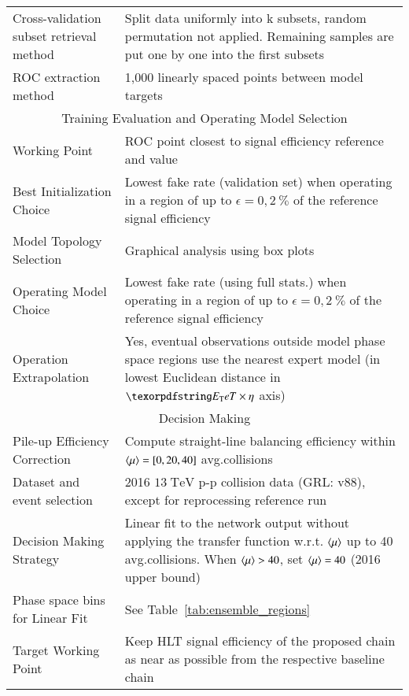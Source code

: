 \begin{table}[ht!]
{\begin{tabular}{p{6cm}p{10cm}}
Cross-validation subset retrieval method & Split data uniformly into k subsets,
random permutation not applied. Remaining samples are put one by one into the
first subsets \\
ROC extraction method & 1,000 linearly spaced points between model targets \\
\hline
\hline
\multicolumn{2}{c}{Training Evaluation and Operating Model Selection } \\
\hline
\hline

Working Point & ROC point closest to signal efficiency reference and \spmax{}
value \\

Best Initialization Choice & Lowest fake rate (validation set) when operating in
a region of up to $\epsilon=0,2~\%$ of the reference signal efficiency \\

Model Topology Selection & Graphical analysis using box plots \\

Operating Model Choice & Lowest fake rate (using full stats.) when operating in
a region of up to $\epsilon=0,2~\%$ of the reference signal efficiency \\

Operation Extrapolation & Yes, eventual observations outside model phase
space regions use the nearest expert model (in lowest Euclidean
distance in $\et\times\eta$ axis) \\

\hline
\hline
\multicolumn{2}{c}{Decision Making} \\
\hline
\hline

Pile-up Efficiency Correction & Compute straight-line balancing efficiency within
$\langle \mu \rangle=[0,20,40]$ avg.\@ collisions \\
Dataset and event selection & 2016 $13\;\text{TeV}$ p-p collision data
(GRL: v88), except for reprocessing reference run \\
Decision Making Strategy & Linear fit to the network output without applying the
transfer function w.r.t. $\langle \mu \rangle$ up to 40$\;$avg.\@ collisions.
When $\langle \mu \rangle>40$, set $\langle \mu \rangle = 40$ (2016 upper bound) \\

Phase space bins for Linear Fit & See
Table~\ref{tab:ensemble_regions}\\
Target Working Point & Keep HLT signal efficiency of the proposed chain as near
as possible from the respective baseline chain \\
\hline
\hline
\hline
\end{tabular}
}
\end{table}


